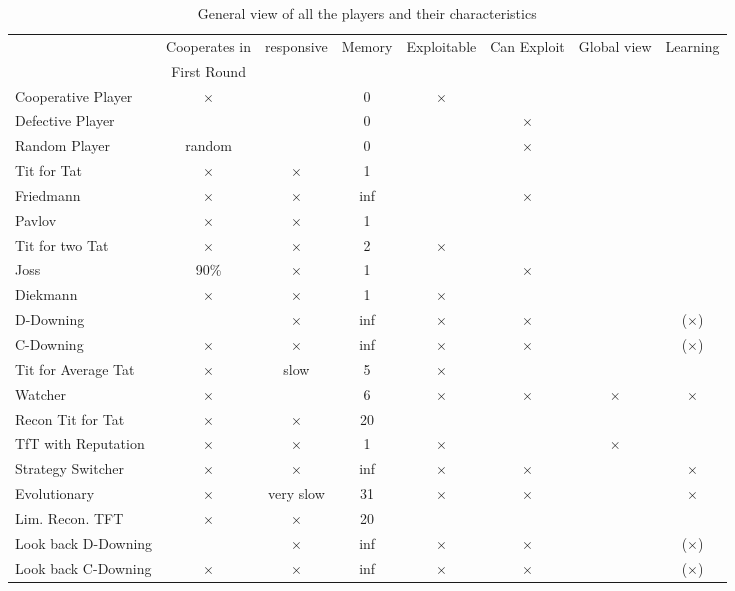  \renewcommand\headrulewidth{0pt}
\fancyhead{} %
\begin{sidewaystable}
\begin{tabular}[]{|l|c|c|c|c|c|c|c|}
  \hline
  			& Cooperates in&responsive& Memory	&Exploitable	& Can Exploit&Global view	&Learning	\\
  			&  First Round&		&      		&		&		&		&		\\
  \hline
  Cooperative Player& $\times$	&		&0		&$\times$	&		&		&		\\
 \hline
  Defective Player 	&  		&		&0		&		&$\times$	&		&		\\
 \hline  
Random Player 	& random	&		&0		&		&$\times$	&		&		\\
 \hline  
Tit for Tat 		& $\times$	&$\times$	&1		&		&		&		&		\\
 \hline
  Friedmann 		& $\times$	&$\times$	&inf		&		&$\times$	&		&		\\
 \hline
 Pavlov		& $\times$	&$\times$	&1		&		&		&		&		\\
 \hline
Tit for two Tat	& $\times$	&$\times$	&2		&$\times$	&		&		&		\\
 \hline
 Joss 			& 90\%	&$\times$	&1		&		&$\times$	&		&		\\
 \hline
Diekmann 		& $\times$	&$\times$	&1		&$\times$	&		&		&		\\
 \hline
D-Downing 		&  		&$\times$	&inf		&$\times$	&$\times$	&		&($\times$)	\\
 \hline
C-Downing 		& $\times$	&$\times$	&inf		&$\times$	&$\times$	&		&($\times$)	\\
 \hline
Tit for Average Tat	& $\times$	&slow		&5		&$\times$	&		&		&		\\
 \hline
Watcher 		& $\times$	&		&6		&$\times$	&$\times$	&$\times$	&$\times$	\\
 \hline
Recon Tit for Tat	& $\times$	&$\times$	&20		&		&		&		&		\\
 \hline
TfT with Reputation& $\times$	&$\times$	&1		&$\times$	&		&$\times$	&		\\
 \hline
Strategy Switcher	& $\times$	&$\times$	&inf		&$\times$	&$\times$	&		&$\times$	\\
 \hline
Evolutionary		& $\times$	&very slow	&31		&$\times$	&$\times$	&		&$\times$	\\
 \hline
Lim. Recon. TFT	& $\times$	&$\times$	&20		&		&		&		&		\\
 \hline
Look back D-Downing& 		&$\times$	&inf		&$\times$	&$\times$	&		&($\times$)	\\
 \hline
Look back C-Downing& $\times$	&$\times$	&inf		&$\times$	&$\times$	&		&($\times$)	\\
 \hline
\end{tabular}
\caption{General view of all the players and their characteristics}
\label{overview}
\end{sidewaystable}

\fancyhead[LE,RO]{ \rightmark}
\fancyhead[LO,RE]{ \leftmark}
 \renewcommand\headrulewidth{0.4pt}
